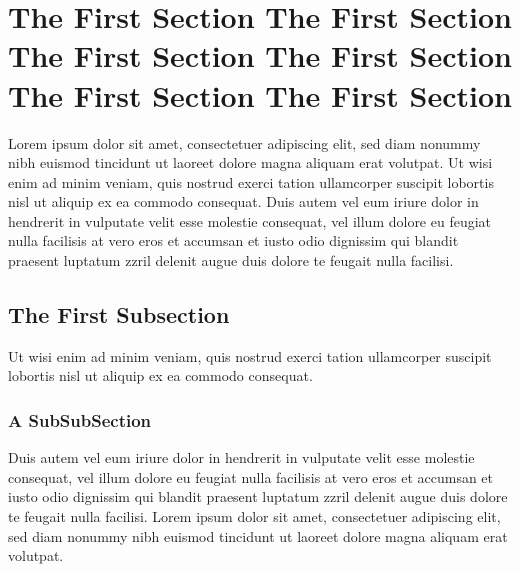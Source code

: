 \documentclass[oldfontcommands,6x9]{pupbook}
\begin{document}
\section{The First Section The First Section The First Section The First Section The First Section The First Section }
Lorem ipsum  dolor sit amet, consectetuer adipiscing elit, sed diam
nonummy nibh euismod tincidunt ut laoreet dolore magna aliquam erat
volutpat. Ut wisi enim ad minim veniam, quis nostrud exerci tation
ullamcorper suscipit lobortis nisl ut aliquip ex ea commodo consequat.
Duis autem vel eum iriure dolor in hendrerit in vulputate velit esse
molestie consequat, vel illum dolore eu feugiat nulla facilisis at vero
eros et accumsan et iusto odio dignissim qui blandit praesent luptatum
zzril delenit augue duis dolore te feugait nulla facilisi. 

\subsection{The First Subsection}\label{subsecref}

Ut wisi enim ad minim veniam,  quis nostrud exerci tation ullamcorper
suscipit lobortis nisl ut aliquip ex ea commodo consequat. 

\subsubsection{A SubSubSection}
Duis autem
vel eum iriure dolor in hendrerit in vulputate velit esse molestie
consequat, vel illum dolore eu feugiat nulla facilisis at vero eros et
accumsan et iusto odio dignissim qui blandit praesent luptatum zzril
delenit augue duis dolore te feugait nulla facilisi. Lorem ipsum dolor
sit amet, consectetuer adipiscing elit, sed diam nonummy nibh euismod
tincidunt ut laoreet dolore magna aliquam erat volutpat.  
\end{document}
